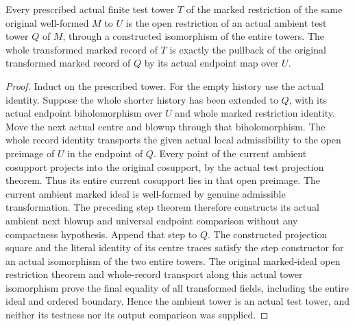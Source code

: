 \begin{theorem}
\label{hir:open-cosupport-actual-finite-history-extension}
\leanok
Every prescribed actual finite test tower $T$ of the marked restriction of the
same original well-formed $M$ to $U$ is the open restriction of an actual ambient
test tower $Q$ of $M$, through a constructed isomorphism of the entire towers.
The whole transformed marked record of $T$ is exactly the pullback of the
original transformed marked record of $Q$ by its actual endpoint map over $U$.
\end{theorem}
\begin{proof}
Induct on the prescribed tower.  For the empty history use the actual identity.
Suppose the whole shorter history has been extended to $Q$, with its actual
endpoint biholomorphism over $U$ and whole marked restriction identity.  Move
the next actual centre and blowup through that biholomorphism.  The whole record
identity transports the given actual local admissibility to the open preimage
of $U$ in the endpoint of $Q$.  Every point of the current ambient cosupport
projects into the original cosupport, by the actual test projection theorem.
Thus its entire current cosupport lies in that open preimage.  The current
ambient marked ideal is well-formed by genuine admissible transformation.
The preceding step theorem therefore constructs its actual ambient next
blowup and universal endpoint comparison without any compactness hypothesis.
Append that step to $Q$.  The constructed projection square and the literal
identity of its centre traces satisfy the step constructor for an actual
isomorphism of the two entire towers.  The original marked-ideal open
restriction theorem and whole-record transport along this actual tower
isomorphism prove the final equality of all transformed fields, including the
entire ideal and ordered boundary.  Hence the ambient tower is an actual test
tower, and neither its testness nor its output comparison was supplied.
\end{proof}
